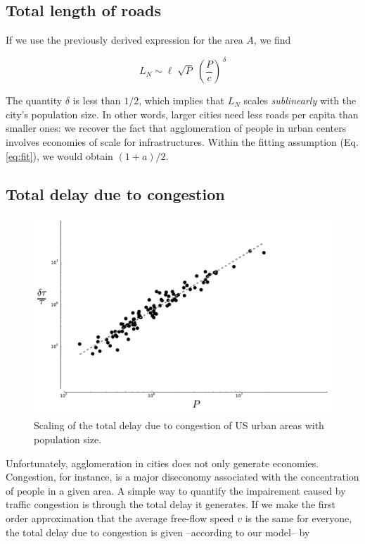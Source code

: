 \subsection{Total length of roads}

If we use the previously derived expression for the area $A$, we find

\begin{equation}
    L_N \sim \ell \; \sqrt{P}\; \left(\frac{P}{c}\right)^{\,\delta}
\end{equation}

The quantity $\delta$ is less than $1/2$, which implies that $L_N$ scales
\emph{sublinearly} with the city's population size. In other words, larger
cities need less roads per capita than smaller ones: we recover the fact that
agglomeration of people in urban centers involves economies of scale for
infrastructures. Within the fitting assumption (Eq.\ref{eq:fit}), we would
obtain $(1+a)/2$.

\subsection{Total delay due to congestion}

\begin{figure}
    \centering
    \includegraphics[width=\textwidth]{gfx/chapter-scaling/scaling_delay.pdf}
    \caption{Scaling of the total delay due to congestion of US urban areas with
    population size. \label{fig:scaling_delay}}
\end{figure}

Unfortunately, agglomeration in cities does not only generate economies.
Congestion, for instance, is a major diseconomy associated with the
concentration of people in a given area. A simple way to quantify the
impairement caused by traffic congestion is through the total delay it
generates. If we make the first order approximation that the average free-flow
speed $v$ is the same for everyone, the total delay due to congestion is given
--according to our model-- by

